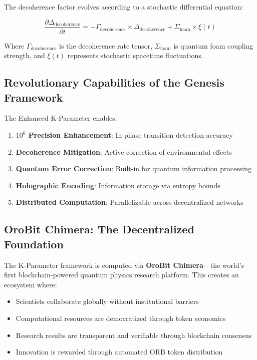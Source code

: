 \documentclass[12pt,a4paper]{article}
\begin{document}
The decoherence factor evolves according to a stochastic differential equation:

\begin{equation}
\frac{\partial \Delta_{\text{decoherence}}}{\partial t} =
-\Gamma_{\text{decoherence}} \times \Delta_{\text{decoherence}} +
\Sigma_{\text{foam}} \times \xi(t)
\end{equation}

Where $\Gamma_{\text{decoherence}}$ is the decoherence rate tensor, $\Sigma_{\text{foam}}$ is
quantum foam coupling strength, and $\xi(t)$ represents stochastic spacetime fluctuations.

\subsection{Revolutionary Capabilities of the Genesis Framework}

The Enhanced K-Parameter enables:
\begin{enumerate}
    \item \textbf{$10^6$ Precision Enhancement}: In phase transition detection accuracy
    \item \textbf{Decoherence Mitigation}: Active correction of environmental effects
    \item \textbf{Quantum Error Correction}: Built-in for quantum information processing
    \item \textbf{Holographic Encoding}: Information storage via entropy bounds
    \item \textbf{Distributed Computation}: Parallelizable across decentralized networks
\end{enumerate}

\subsection{OroBit Chimera: The Decentralized Foundation}

The K-Parameter framework is computed via \textbf{OroBit Chimera}---the world's first
blockchain-powered quantum physics research platform. This creates an ecosystem where:

\begin{itemize}
    \item Scientists collaborate globally without institutional barriers
    \item Computational resources are democratized through token economics
    \item Research results are transparent and verifiable through blockchain consensus
    \item Innovation is rewarded through automated ORB token distribution
\end{itemize}
\end{document}
